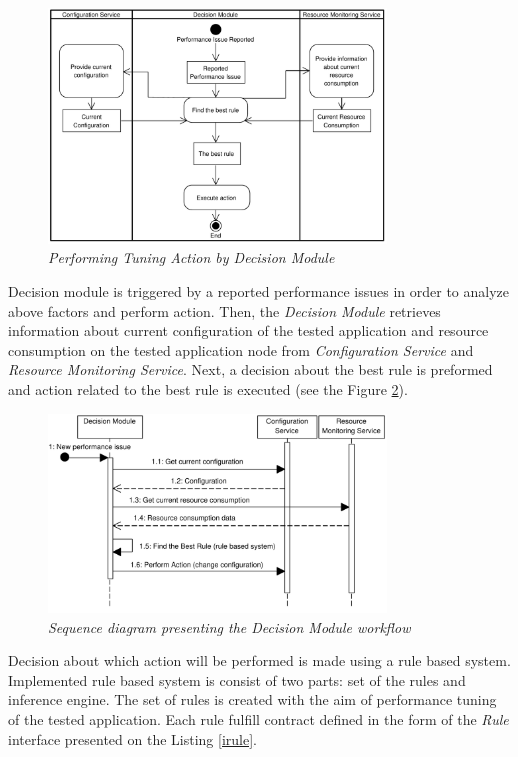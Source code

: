 \documentclass[12pt,a4paper]{article}
\begin{document}
\begin{figure}[!htb]
\centering
\includegraphics[width=0.8\textwidth]{APTSFlow}
\caption{\textit{Performing Tuning Action by Decision Module}} \label{decisionmodule}
\end{figure}

Decision module is triggered by a reported performance issues in order to analyze above factors and perform action. Then, the \textit{Decision Module} retrieves information about current configuration of the tested application and resource consumption on the tested application node from \textit{Configuration Service} and \textit{Resource Monitoring Service}. Next, a decision about the best rule is preformed and action related to the best rule is executed (see the Figure \ref{dmsequence}). 

\begin{figure}[!htb]
\centering
\includegraphics[width=0.8\textwidth]{DecisionModuleSequenceDiagram}
\caption{\textit{Sequence diagram presenting the Decision Module workflow}} \label{dmsequence}
\end{figure}

Decision about which action will be performed is made using a rule based system. Implemented rule based system is consist of two parts: set of the rules and inference engine. The set of rules is created with the aim of performance tuning of the tested application. Each rule fulfill contract defined in the form of the \textit{Rule} interface presented on the Listing \ref{irule}.
\end{document}
